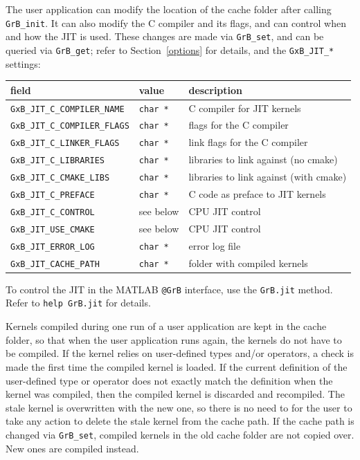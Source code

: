 The user application can modify the location of the cache folder after calling
\verb'GrB_init'.  It can also modify the C compiler and its flags, and can
control when and how the JIT is used.  These changes are made via
\verb'GrB_set', and can be queried via \verb'GrB_get'; refer to
Section~\ref{options} for details, and the \verb'GxB_JIT_*' settings:

\vspace{0.15in}
{\footnotesize
\begin{tabular}{lll}
\hline
field                       & value         & description \\
\hline
\verb'GxB_JIT_C_COMPILER_NAME' & \verb'char *' & C compiler for JIT kernels \\
\verb'GxB_JIT_C_COMPILER_FLAGS'& \verb'char *' & flags for the C compiler \\
\verb'GxB_JIT_C_LINKER_FLAGS' & \verb'char *' & link flags for the C compiler \\
\verb'GxB_JIT_C_LIBRARIES'    & \verb'char *' & libraries to link against (no cmake) \\
\verb'GxB_JIT_C_CMAKE_LIBS'   & \verb'char *' & libraries to link against (with cmake) \\
\verb'GxB_JIT_C_PREFACE'      & \verb'char *' & C code as preface to JIT kernels \\
\verb'GxB_JIT_C_CONTROL'      & see below     & CPU JIT control \\
\verb'GxB_JIT_USE_CMAKE'      & see below     & CPU JIT control \\
\verb'GxB_JIT_ERROR_LOG'      & \verb'char *' & error log file \\
\verb'GxB_JIT_CACHE_PATH'     & \verb'char *' & folder with compiled kernels \\
\hline
\end{tabular}
}
\vspace{0.15in}

To control the JIT in the MATLAB \verb'@GrB' interface, use the \verb'GrB.jit'
method.  Refer to \verb'help GrB.jit' for details.

Kernels compiled during one run of a user application are kept in the cache
folder, so that when the user application runs again, the kernels do not have
to be compiled.  If the kernel relies on user-defined types and/or operators, a
check is made the first time the compiled kernel is loaded.  If the current
definition of the user-defined type or operator does not exactly match the
definition when the kernel was compiled, then the compiled kernel is discarded
and recompiled.  The stale kernel is overwritten with the new one, so there is
no need to for the user to take any action to delete the stale kernel from the
cache path.  If the cache path is changed via \verb'GrB_set', compiled kernels
in the old cache folder are not copied over.  New ones are compiled instead.

